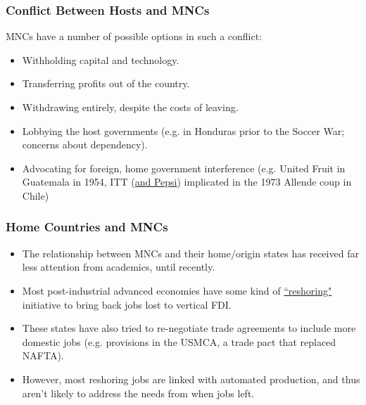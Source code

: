 \documentclass[handout]{beamer}
\begin{document}
\begin{frame} 
	\frametitle{\LARGE{Conflict Between Hosts and MNCs}}
	\begin{itemize}
		\large{
			\item MNCs have a number of possible options in such a conflict: \pause  
			\begin{itemize}
				\item Withholding capital and technology. \pause 
				\item Transferring profits out of the country. \pause 
				\item Withdrawing entirely, despite the costs of leaving. \pause 
				\item Lobbying the host governments (e.g. in Honduras prior to the Soccer War; concerns about dependency). \pause 
				\item Advocating for foreign, home government interference (e.g. United Fruit in Guatemala in 1954, ITT (\href{https://www.theguardian.com/business/1998/nov/08/observerbusiness.theobserver}{and Pepsi}) implicated in the 1973 Allende coup in Chile) 
			\end{itemize}
		}
	\end{itemize}
\end{frame}

\begin{frame} 
	\frametitle{\LARGE{Home Countries and MNCs}}
	\begin{itemize}
		\item The relationship between MNCs and their home/origin states has received far less attention from academics, until recently. \pause 
		\item Most post-industrial advanced economies have some kind of \href{https://www.jmfrri.gr.jp/english/430.html}{``reshoring"} initiative to bring back jobs lost to vertical FDI. \pause 
		\item These states have also tried to re-negotiate trade agreements to include more domestic jobs (e.g. provisions in the USMCA, a trade pact that replaced NAFTA). \pause 
		\item However, most reshoring jobs are linked with automated production, and thus aren't likely to address the needs from when jobs left.
	\end{itemize}
\end{frame}
\end{document}
